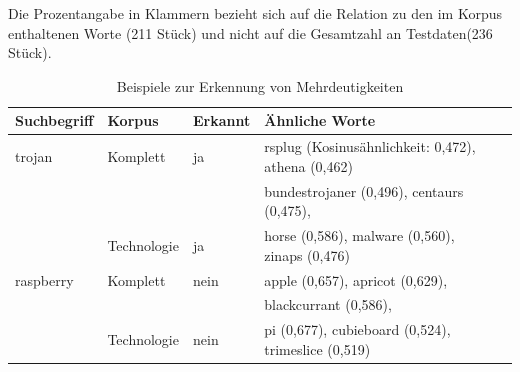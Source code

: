 \documentclass[12pt,a4paper]{report}
\begin{document}
		Die Prozentangabe in Klammern bezieht sich auf die Relation zu den im Korpus enthaltenen Worte (211 Stück) und nicht auf die Gesamtzahl an Testdaten(236 Stück).\\
		
\begin{table}[h]
\caption{Beispiele zur Erkennung von Mehrdeutigkeiten}
\begin{center}
\begin{tabular}{|l||l|l|l|l|}
\hline
Suchbegriff & Korpus & Erkannt & Ähnliche Worte   \\
\hline
\hline
 trojan & Komplett & ja &rsplug (Kosinusähnlichkeit: 0,472), athena (0,462)\\
 &	&	& bundestrojaner (0,496), centaurs (0,475), \\
 &  Technologie & ja & horse (0,586), malware (0,560), zinaps (0,476)\\
 \hline
 
raspberry& Komplett& nein & apple (0,657), apricot (0,629), \\
&&&blackcurrant (0,586),  \\
&Technologie & nein & pi (0,677), cubieboard (0,524), trimeslice (0,519)\\
\hline
 
\end{tabular}
\end{center}
\end{table}
		
\end{document}

